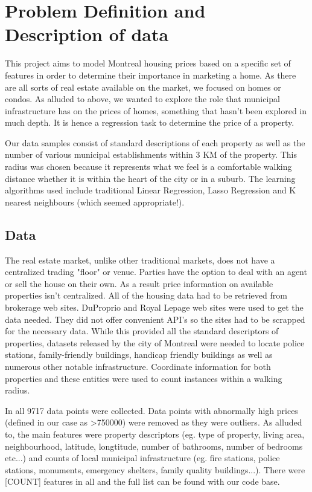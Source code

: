 \documentclass{acm_proc_article-sp}
\begin{document}
\section{Problem Definition and Description of data}
	
	This project aims to model Montreal housing prices based on a specific set of features in order to determine their importance in marketing a home. As there are all sorts of real estate available on the market, we focused on homes or condos. As alluded to above, we wanted to explore the role that municipal infrastructure has on the prices of homes, something that hasn't been explored in much depth. It is hence a regression task to determine the price of a property.
	
	Our data samples consist of standard descriptions of each property as well as the number of various municipal establishments within 3 KM of the property. This radius was chosen because it represents what we feel is a comfortable walking distance whether it is within the heart of the city or in a suburb. The learning algorithms used include traditional Linear Regression, Lasso Regression and K nearest neighbours (which seemed appropriate!). 

\subsection{Data}

	The real estate market, unlike other traditional markets, does not have a centralized trading "floor" or venue. Parties have the option to deal with an agent or sell the house on their own. As a result price information on available properties isn't centralized. All of the housing data had to be retrieved from brokerage web sites. DuProprio and Royal Lepage web sites were used to get the data needed. They did not offer convenient API's so the sites had to be scrapped for the necessary data. While this provided all the standard descriptors of properties, datasets released by the city of Montreal were needed to locate police stations, family-friendly buildings, handicap friendly buildings as well as numerous other notable infrastructure. Coordinate information for both properties and these entities were used to count instances within a walking radius.
	
	In all 9717 data points were collected. Data points with abnormally high prices (defined in our case as >750000) were removed as they were outliers. As alluded to, the main features were property descriptors (eg. type of property, living area, neighbourhood, latitude, longtitude, number of bathrooms, number of bedrooms etc...) and counts of local municipal infrastructure (eg. fire stations, police stations, monuments, emergency shelters, family quality buildings...). There were [COUNT] features in all and the full list can be found with our code base.
	
\end{document}
